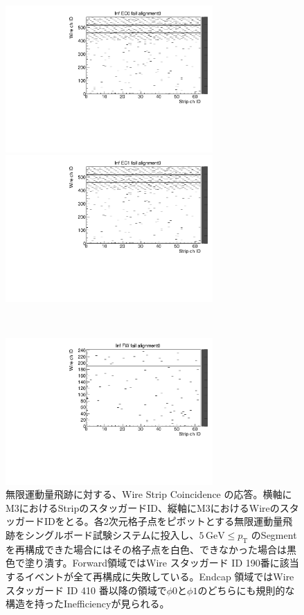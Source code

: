 \begin{figure}
    \begin{minipage}[b]{.5\linewidth}
        \centering
        \includegraphics[height=5.6cm]{fig/Test/A_InfEC0_WS.pdf}
    \end{minipage}
    \begin{minipage}[b]{.5\linewidth}
        \centering
        \includegraphics[height=5.6cm]{fig/Test/A_InfEC1_WS.pdf}
    \end{minipage}\\
    \begin{minipage}[b]{\linewidth}
        \centering
        \includegraphics[height=5.6cm]{fig/Test/A_InfFW_WS.pdf}
    \end{minipage}
    \caption[無限運動量飛跡に対する、Wire Strip Coincidence の応答]{無限運動量飛跡に対する、Wire Strip Coincidence の応答。横軸にM3におけるStripのスタッガードID、縦軸にM3におけるWireのスタッガードIDをとる。各2次元格子点をピボットとする無限運動量飛跡をシングルボード試験システムに投入し、$5\,\mathrm{GeV} \leq p_\mathrm{T}$ のSegmentを再構成できた場合にはその格子点を白色、できなかった場合は黒色で塗り潰す。Forward領域ではWire スタッガード ID 190番に該当するイベントが全て再構成に失敗している。Endcap 領域ではWire スタッガード ID 410 番以降の領域で$\phi0$と$\phi1$のどちらにも規則的な構造を持ったInefficiencyが見られる。}
    \label{Inf_A_WS}
\end{figure}

